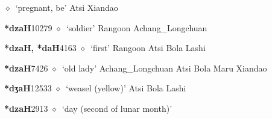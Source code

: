 \begin{list}{}{\leftmargin=1.5em \itemindent=-1.5em}
\hspace{1ex}
         $\diamond$~`pregnant, be'
         Atsi 
\hspace{1ex}
         Xiandao 
  \item {\footnotesize \textbf{*dzaH}}{\tiny 10279}
\hspace{1ex}
         $\diamond$~`soldier'
         Rangoon 
\hspace{1ex}
         Achang\_Longchuan 
  \item {\footnotesize \textbf{*dzaH, *daH}}{\tiny 4163}
\hspace{1ex}
         $\diamond$~`first'
         Rangoon 
\hspace{1ex}
         Atsi 
\hspace{1ex}
         Bola 
\hspace{1ex}
         Lashi 
  \item {\footnotesize \textbf{*dzaH}}{\tiny 7426}
\hspace{1ex}
         $\diamond$~`old lady'
         Achang\_Longchuan 
\hspace{1ex}
         Atsi 
\hspace{1ex}
         Bola 
\hspace{1ex}
         Maru 
\hspace{1ex}
         Xiandao 
  \item {\footnotesize \textbf{*dʒaH}}{\tiny 12533}
\hspace{1ex}
         $\diamond$~`weasel (yellow)'
         Atsi 
\hspace{1ex}
         Bola 
\hspace{1ex}
         Lashi 
  \item {\footnotesize \textbf{*dzaH}}{\tiny 2913}
\hspace{1ex}
         $\diamond$~`day (second of lunar month)'

\end{list}
